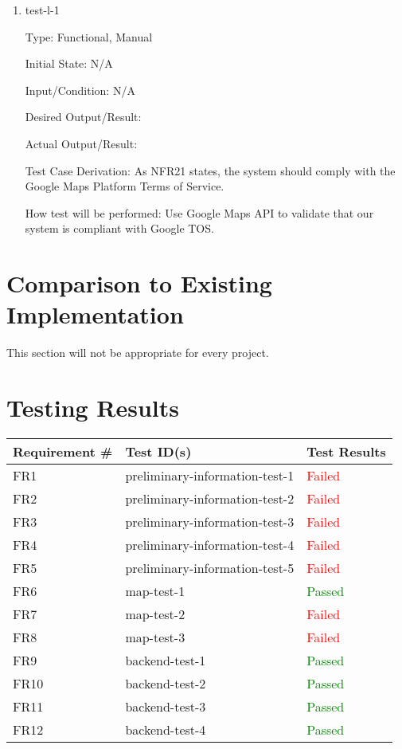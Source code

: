 \documentclass[12pt, titlepage]{article}
\begin{document}
\begin{enumerate}

\item{test-l-1\\}

Type: Functional, Manual

Initial State: N/A	

Input/Condition: N/A		

Desired Output/Result:  

Actual Output/Result:

Test Case Derivation: As NFR21 states, the system should comply with the Google Maps Platform Terms of Service.

How test will be performed: Use Google Maps API to validate that our system is compliant with Google TOS. 

\end{enumerate}
	
\section{Comparison to Existing Implementation}

This section will not be appropriate for every project.

\newpage
\section{Testing Results}
  \begin{table}[h!]
	
	\begin{tabular}{|p{3.5cm}|p{6.5cm}|p{4.5cm}|}

	\hline
	\textbf{Requirement \#} & \textbf{Test ID(s)}   &\textbf{Test Results}  \\ \hline
	FR1 & preliminary-information-test-1 & \textcolor{red}{Failed} \\ \hline
	FR2 & preliminary-information-test-2 & \textcolor{red}{Failed}   \\ \hline
	FR3 & preliminary-information-test-3 & \textcolor{red}{Failed} \\ \hline
	FR4 & preliminary-information-test-4 & \textcolor{red}{Failed} \\ \hline
	FR5 & preliminary-information-test-5 & \textcolor{red}{Failed}  \\ \hline
	FR6 & map-test-1 & \textcolor{green}{Passed} \\ \hline
	FR7 & map-test-2 & \textcolor{red}{Failed}  \\ \hline
	FR8 & map-test-3 & \textcolor{red}{Failed}  \\ \hline
	FR9 & backend-test-1 & \textcolor{green}{Passed}\\ \hline
	FR10 & backend-test-2 & \textcolor{green}{Passed} \\ \hline
	FR11 & backend-test-3 & \textcolor{green}{Passed}\\ \hline
	FR12 & backend-test-4 & \textcolor{green}{Passed}\\ \hline
	
	\end{tabular}
	
  \end{table}
\end{document}
